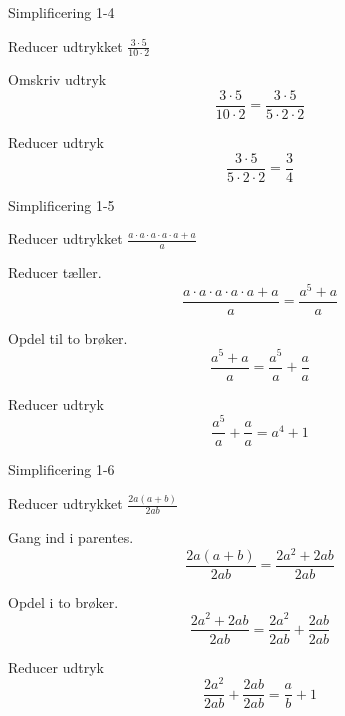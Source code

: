 \documentclass{article}
\begin{document}
\newpage

\begin{exercise}{Simplificering 1-4}
	
	Reducer udtrykket $\frac{3 \cdot 5}{10 \cdot 2}$
	
	
	\hint
	
	Omskriv udtryk
	\[
	\frac{3 \cdot 5}{10 \cdot 2} =  \frac{3 \cdot 5}{5 \cdot 2 \cdot 2}
	\]
	
	\hint
	
	Reducer udtryk
	\[
	\frac{3 \cdot 5}{5 \cdot 2 \cdot 2} = \frac{3}{4}
	\]
	

	
\end{exercise}

\newpage

\begin{exercise}{Simplificering 1-5}
	
	Reducer udtrykket $\frac{a \cdot a \cdot a \cdot a \cdot a + a}{a}$
	
	
	\hint
	
	Reducer tæller.
	\[
	\frac{a \cdot a \cdot a \cdot a \cdot a + a}{a}  = \frac{a^5+a}{a}
	\]
	
	\hint 
	
	Opdel  til to brøker.
	\[
	\frac{a^5+a}{a} = \frac{a^5}{a} + \frac{a}{a}
	\]
	
	\hint
	
	Reducer udtryk 
	\[
	 \frac{a^5}{a} + \frac{a}{a} = a^4 + 1
	\]
		
\end{exercise}

\newpage

\begin{exercise}{Simplificering 1-6}
	
	Reducer udtrykket $\frac{2a(a+b)}{2ab}$
	
	
	\hint
	
	Gang ind i parentes.
	\[
	\frac{2a(a+b)}{2ab} = \frac{2a^2 + 2ab}{2ab}
	\]
	
	\hint
	
	Opdel i to brøker.
	\[
	 \frac{2a^2 + 2ab}{2ab} = \frac{2a^2}{2ab} + \frac{2ab}{2ab}
	\]
	
	
	\hint
	
	Reducer udtryk 
	\[
	\frac{2a^2}{2ab} + \frac{2ab}{2ab} = \frac{a}{b} + 1
	\]
	
\end{exercise}
\end{document}
